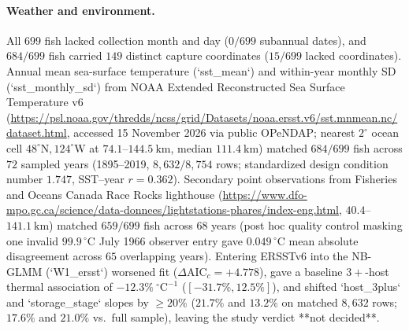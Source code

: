 \paragraph{Weather and environment.}
All $699$ fish lacked collection month and day ($0/699$ subannual dates), and $684/699$ fish carried $149$ distinct capture coordinates ($15/699$ lacked coordinates). Annual mean sea-surface temperature (`sst\_mean`) and within-year monthly SD (`sst\_monthly\_sd`) from NOAA Extended Reconstructed Sea Surface Temperature v6 (\url{https://psl.noaa.gov/thredds/ncss/grid/Datasets/noaa.ersst.v6/sst.mnmean.nc/dataset.html}, accessed 15 November 2026 via public OPeNDAP; nearest $2^\circ$ ocean cell $48^{\circ}\mathrm{N}, 124^{\circ}\mathrm{W}$ at $74.1$--$144.5\ \mathrm{km}$, median $111.4\ \mathrm{km}$) matched $684/699$ fish across $72$ sampled years (1895--2019, $8{,}632/8{,}754$ rows; standardized design condition number $1.747$, SST--year $r = 0.362$). Secondary point observations from Fisheries and Oceans Canada Race Rocks lighthouse (\url{https://www.dfo-mpo.gc.ca/science/data-donnees/lightstations-phares/index-eng.html}, $40.4$--$141.1\ \mathrm{km}$) matched $659/699$ fish across $68$ years (post hoc quality control masking one invalid $99.9\,^{\circ}\mathrm{C}$ July 1966 observer entry gave $0.049\,^{\circ}\mathrm{C}$ mean absolute disagreement across $65$ overlapping years). Entering ERSSTv6 into the NB-GLMM (`W1\_ersst`) worsened fit ($\Delta\mathrm{AIC}_c = +4.778$), gave a baseline $3+$-host thermal association of $-12.3\%\ {}^{\circ}\mathrm{C}^{-1}$ ($[-31.7\%, 12.5\%]$), and shifted `host\_3plus` and `storage\_stage` slopes by $\ge 20\%$ ($21.7\%$ and $13.2\%$ on matched $8{,}632$ rows; $17.6\%$ and $21.0\%$ vs.\ full sample), leaving the study verdict **not decided**.

